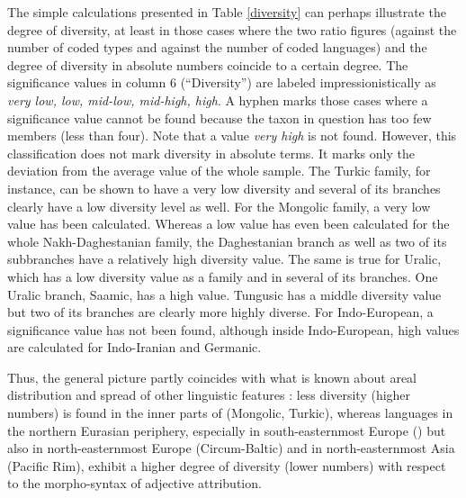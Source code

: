 The simple calculations presented in Table \ref{diversity} can perhaps illustrate the degree of diversity, at least in those cases where the two ratio figures (against the number of coded types and against the number of coded languages) and the degree of diversity in absolute numbers coincide to a certain degree. The significance values in column 6 (“Diversity”) are labeled impressionistically as \textit{very low, low, mid-low, mid-high, high}. A hyphen marks those cases where a significance value cannot be found because the taxon in question has too few members (less than four). Note that a value \textit{very high} is not found. 
 However, this classification does not mark diversity in absolute terms. It marks only the deviation from the average value of the whole sample. The Turkic family, for instance, can be shown to have a very low diversity and several of its branches clearly have a low diversity level as well. For the Mongolic family, a very low value has been calculated. Whereas a low value has even been calculated for the whole Nakh\hyp{}Daghestanian family, the Daghestanian branch as well as two of its subbranches have a relatively high diversity value. The same is true for Uralic, which has a low diversity value as a family and in several of its branches. One Uralic branch, Saamic, has a high value. Tungusic has a middle diversity value but two of its branches are clearly more highly diverse. For Indo-European, a significance value has not been found, although inside Indo-European, high values are calculated for Indo-Iranian and Germanic.

Thus, the general picture partly coincides with what is known about areal distribution and spread of other linguistic features \citep[cf., e.g.,][]{nichols1992}: less diversity (higher numbers) is found in the inner parts of  (Mongolic, Turkic), whereas languages in the northern Eurasian periphery, especially in south\hyp{}easternmost Europe () but also in north-easternmost Europe (Circum-Baltic) and in north-easternmost Asia (Pacific Rim), exhibit a higher degree of diversity (lower numbers) with respect to the morpho-syntax of adjective attribution.


